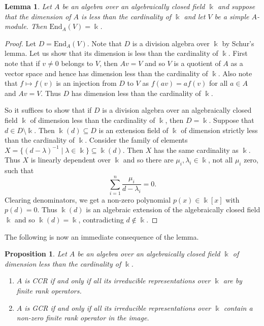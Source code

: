 \documentclass[11pt,reqno]{amsart}
\theoremstyle{plain}
\newtheorem{prop}[thm]{Proposition}
\newtheorem{lem}[thm]{Lemma}
\numberwithin{equation}{section}
\begin{document}
\begin{lem}\label{l:schur.dim}
Let $A$ be an algebra over an algebraically closed field $\Bbbk$  and suppose that the dimension of $A$ is less than the cardinality of $\Bbbk$ and let $V$ be a simple $A$-module. Then $\mathrm{End}_A(V)=\Bbbk$.
\end{lem}
\begin{proof}
Let $D=\mathrm{End}_A(V)$.  Note that $D$ is a division algebra over $\Bbbk$ by Schur's lemma.  Let us show that its dimension is less than the cardinality of $\Bbbk$.
First note that if $v\neq 0$ belongs to $V$, then $Av=V$ and so $V$ is a quotient of $A$ as a vector space and hence has dimension less than the cardinality of $\Bbbk$.  Also note that $f\mapsto f(v)$ is an injection from $D$ to $V$ as $f(av)=af(v)$ for all $a\in A$ and $Av=V$.  Thus $D$ has dimension less than the cardinality of $\Bbbk$.

So it suffices to show that if $D$ is a division algebra over an algebraically closed field $\Bbbk$ of dimension less than the cardinality of $\Bbbk$, then $D=\Bbbk$.  Suppose that $d\in D\setminus \Bbbk$.  Then $\Bbbk(d)\subseteq D$ is an extension field of $\Bbbk$ of dimension strictly less than the cardinality of $\Bbbk$.   Consider the family of elements $X=\{(d-\lambda)^{-1}\mid \lambda\in \Bbbk\}\subseteq \Bbbk(d)$.  Then $X$  has the same cardinality as $\Bbbk$.  Thus $X$ is linearly dependent over $\Bbbk$ and so there are $\mu_i,\lambda_i\in \Bbbk$, not all $\mu_i$  zero, such that
\[\sum_{i=1}^n \frac{\mu_i}{d-\lambda_i}=0.\]  Clearing denominators, we get a non-zero polynomial $p(x)\in \Bbbk [x]$ with $p(d)=0$.  Thus $\Bbbk(d)$ is an algebraic extension of the algebraically closed field $\Bbbk$ and so $\Bbbk(d)=\Bbbk$, contradicting $d\notin \Bbbk$.
\end{proof}


The following is now an immediate consequence of the lemma.

\begin{prop}\label{p:algclosecase}
Let $A$ be an algebra over an algebraically closed field $\Bbbk$ of dimension less than the cardinality of $\Bbbk$.
\begin{enumerate}
  \item $A$ is CCR if and only if all its irreducible representations over $\Bbbk$  are by finite rank operators.
  \item $A$ is GCR if and only if all its irreducible representations over $\Bbbk$  contain a non-zero finite rank operator in the image.
\end{enumerate}
\end{prop}
\end{document}
